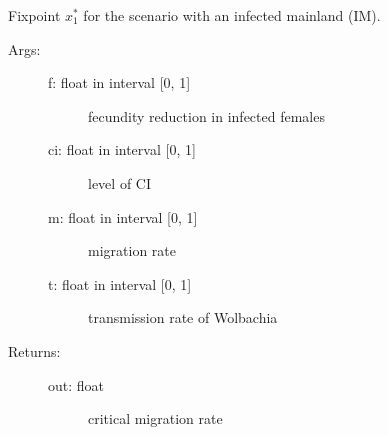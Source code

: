 \documentclass[letterpaper,10pt,english]{sphinxmanual}
\begin{document}
\begin{fulllineitems}
\label{index:wspec.analytical.fix1_IM}
Fixpoint $x_1^{\ast}$ for the scenario with an infected mainland (IM).
\begin{description}
\item[{Args:}] \leavevmode\begin{description}
\item[{f: float in interval {[}0, 1{]}}] \leavevmode
fecundity reduction in infected females

\item[{ci: float in interval {[}0, 1{]}}] \leavevmode
level of CI

\item[{m: float in interval {[}0, 1{]}}] \leavevmode
migration rate

\item[{t: float in interval {[}0, 1{]}}] \leavevmode
transmission rate of Wolbachia

\end{description}

\item[{Returns:}] \leavevmode\begin{description}
\item[{out: float}] \leavevmode
critical migration rate

\end{description}

\end{description}

\end{fulllineitems}

\end{document}
